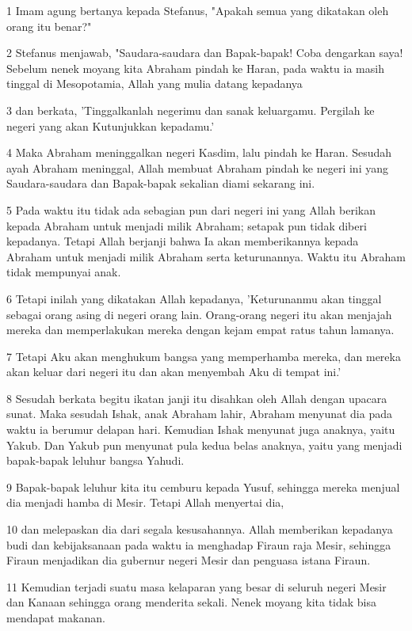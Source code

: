 \par 1 Imam agung bertanya kepada Stefanus, "Apakah semua yang dikatakan oleh orang itu benar?"
\par 2 Stefanus menjawab, "Saudara-saudara dan Bapak-bapak! Coba dengarkan saya! Sebelum nenek moyang kita Abraham pindah ke Haran, pada waktu ia masih tinggal di Mesopotamia, Allah yang mulia datang kepadanya
\par 3 dan berkata, 'Tinggalkanlah negerimu dan sanak keluargamu. Pergilah ke negeri yang akan Kutunjukkan kepadamu.'
\par 4 Maka Abraham meninggalkan negeri Kasdim, lalu pindah ke Haran. Sesudah ayah Abraham meninggal, Allah membuat Abraham pindah ke negeri ini yang Saudara-saudara dan Bapak-bapak sekalian diami sekarang ini.
\par 5 Pada waktu itu tidak ada sebagian pun dari negeri ini yang Allah berikan kepada Abraham untuk menjadi milik Abraham; setapak pun tidak diberi kepadanya. Tetapi Allah berjanji bahwa Ia akan memberikannya kepada Abraham untuk menjadi milik Abraham serta keturunannya. Waktu itu Abraham tidak mempunyai anak.
\par 6 Tetapi inilah yang dikatakan Allah kepadanya, 'Keturunanmu akan tinggal sebagai orang asing di negeri orang lain. Orang-orang negeri itu akan menjajah mereka dan memperlakukan mereka dengan kejam empat ratus tahun lamanya.
\par 7 Tetapi Aku akan menghukum bangsa yang memperhamba mereka, dan mereka akan keluar dari negeri itu dan akan menyembah Aku di tempat ini.'
\par 8 Sesudah berkata begitu ikatan janji itu disahkan oleh Allah dengan upacara sunat. Maka sesudah Ishak, anak Abraham lahir, Abraham menyunat dia pada waktu ia berumur delapan hari. Kemudian Ishak menyunat juga anaknya, yaitu Yakub. Dan Yakub pun menyunat pula kedua belas anaknya, yaitu yang menjadi bapak-bapak leluhur bangsa Yahudi.
\par 9 Bapak-bapak leluhur kita itu cemburu kepada Yusuf, sehingga mereka menjual dia menjadi hamba di Mesir. Tetapi Allah menyertai dia,
\par 10 dan melepaskan dia dari segala kesusahannya. Allah memberikan kepadanya budi dan kebijaksanaan pada waktu ia menghadap Firaun raja Mesir, sehingga Firaun menjadikan dia gubernur negeri Mesir dan penguasa istana Firaun.
\par 11 Kemudian terjadi suatu masa kelaparan yang besar di seluruh negeri Mesir dan Kanaan sehingga orang menderita sekali. Nenek moyang kita tidak bisa mendapat makanan.
